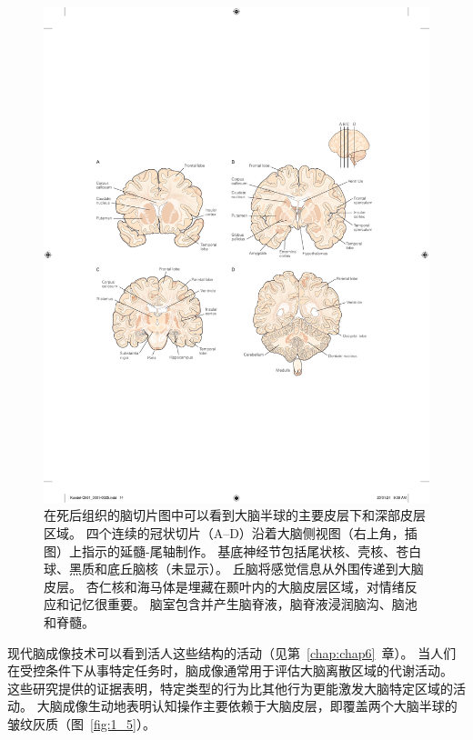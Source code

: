 \begin{figure}[htbp]
	\centering
	\includegraphics[width=1.0\linewidth]{chap01/fig_1_4}
	\caption{在死后组织的脑切片图中可以看到大脑半球的主要皮层下和深部皮层区域。
		四个连续的冠状切片（A–D）沿着大脑侧视图（右上角，插图）上指示的延髓-尾轴制作。
		基底神经节包括尾状核、壳核、苍白球、黑质和底丘脑核（未显示）。
		丘脑将感觉信息从外围传递到大脑皮层。
		杏仁核和海马体是埋藏在颞叶内的大脑皮层区域，对情绪反应和记忆很重要。
		脑室包含并产生脑脊液，脑脊液浸润脑沟、脑池和脊髓\cite{nieuwenhuys2007human}。}
	\label{fig:1_4}
\end{figure}


现代脑成像技术可以看到活人这些结构的活动（见第~\ref{chap:chap6}~章）。
当人们在受控条件下从事特定任务时，脑成像通常用于评估大脑离散区域的代谢活动。
这些研究提供的证据表明，特定类型的行为比其他行为更能激发大脑特定区域的活动。
大脑成像生动地表明认知操作主要依赖于大脑皮层，即覆盖两个大脑半球的皱纹灰质（图~\ref{fig:1_5}）。


